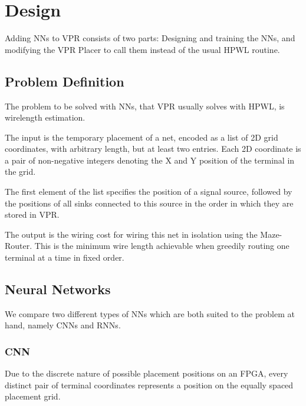 
\chapter{Design}\label{ch:design}
\glsresetall %

Adding \glspl{NN} to \gls{VPR} consists of two parts: Designing and training the \glspl{NN}, and modifying the \gls{VPR} Placer to call them instead of the usual \gls{HPWL} routine.

\section{Problem Definition}

The problem to be solved with \glspl{NN}, that \gls{VPR} usually solves with \gls{HPWL}, is wirelength estimation.

The input is the temporary placement of a net, encoded as a list of 2D grid coordinates, with arbitrary length, but at least two entries. Each 2D coordinate is a pair of non-negative integers denoting the X and Y position of the terminal in the grid. 

The first element of the list specifies the position of a signal source, followed by the positions of all sinks connected to this source in the order in which they are stored in \gls{VPR}.

The output is the wiring cost for wiring this net in isolation using the Maze-Router. This is the minimum wire length achievable when greedily routing one terminal at a time in fixed order.

\section{Neural Networks}

We compare two different types of \glspl{NN} which are both suited to the problem at hand, namely \glspl{CNN} and \glspl{RNN}.

\subsection{\gls{CNN}}

Due to the discrete nature of possible placement positions on an \gls{FPGA}, every distinct pair of terminal coordinates represents a position on the equally spaced placement grid. 

